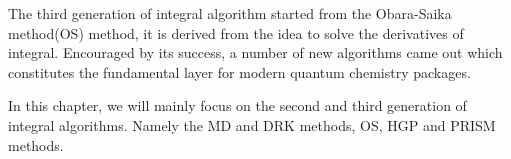 The third generation of integral algorithm started from the Obara-Saika method(OS)\cite{OS1986,
OS1988} method, it is derived from the idea to solve the derivatives of integral\cite{HB1982,HB1989}. 
Encouraged by its success, a number of new algorithms came out\cite{HGP,gill1989efficient,
gill1990efficient,PRISM,coldprism} which constitutes the fundamental
layer for modern quantum chemistry packages. 

In this chapter, we will mainly focus on the second and third generation of integral algorithms. 
Namely the MD and DRK methods, OS, HGP and PRISM methods.







